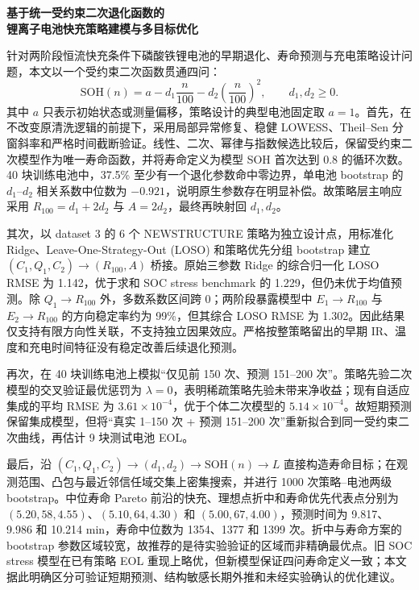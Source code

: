 \documentclass[UTF8,a4paper,zihao=-4]{ctexart}
\newcommand{\SOH}{\mathrm{SOH}}
\newcommand{\Rone}{R_{100}}
\begin{document}
\begin{center}
  {\bfseries{} 基于统一受约束二次退化函数的\\[0.35em]
  锂离子电池快充策略建模与多目标优化}
\end{center}

\vspace{0.7em}
针对两阶段恒流快充条件下磷酸铁锂电池的早期退化、寿命预测与充电策略设计问题，本文以一个受约束二次函数贯通四问：
\[
  \SOH(n)=a-d_1\frac{n}{100}-d_2\left(\frac{n}{100}\right)^2,
  \qquad d_1,d_2\geq 0.
\]
其中 $a$ 只表示初始状态或测量偏移，策略设计的典型电池固定取 $a=1$。首先，在不改变原清洗逻辑的前提下，采用局部异常修复、稳健 LOWESS、Theil--Sen 分窗斜率和严格时间截断验证。线性、二次、幂律与指数候选比较后，保留受约束二次模型作为唯一寿命函数，并将寿命定义为模型 SOH 首次达到 0.8 的循环次数。40 块训练电池中，37.5\% 至少有一个退化参数命中零边界，单电池 bootstrap 的 $d_1$--$d_2$ 相关系数中位数为 $-0.921$，说明原生参数存在明显补偿。故策略层主响应采用 $\Rone=d_1+2d_2$ 与 $A=2d_2$，最终再映射回 $d_1,d_2$。

其次，以 dataset 3 的 6 个 NEWSTRUCTURE 策略为独立设计点，用标准化 Ridge、Leave-One-Strategy-Out (LOSO) 和策略优先分组 bootstrap 建立 $(C_1,Q_1,C_2)\to(\Rone,A)$ 桥接。原始三参数 Ridge 的综合归一化 LOSO RMSE 为 1.142，优于求和 SOC stress benchmark 的 1.229，但仍未优于均值预测。除 $Q_1\to\Rone$ 外，多数系数区间跨 0；两阶段暴露模型中 $E_1\to\Rone$ 与 $E_2\to\Rone$ 的方向稳定率约为 99\%，但其综合 LOSO RMSE 为 1.302。因此结果仅支持有限方向性关联，不支持独立因果效应。严格按整策略留出的早期 IR、温度和充电时间特征没有稳定改善后续退化预测。

再次，在 40 块训练电池上模拟“仅见前 150 次、预测 151--200 次”。策略先验二次模型的交叉验证最优惩罚为 $\lambda=0$，表明稀疏策略先验未带来净收益；现有自适应集成的平均 RMSE 为 $3.61\times10^{-4}$，优于个体二次模型的 $5.14\times10^{-4}$。故短期预测保留集成模型，但将“真实 1--150 次 + 预测 151--200 次”重新拟合到同一受约束二次曲线，再估计 9 块测试电池 EOL。

最后，沿 $(C_1,Q_1,C_2)\to(d_1,d_2)\to\SOH(n)\to L$ 直接构造寿命目标；在观测范围、凸包与最近邻信任域交集上密集搜索，并进行 1000 次策略--电池两级 bootstrap。中位寿命 Pareto 前沿的快充、理想点折中和寿命优先代表点分别为 $(5.20,58,4.55)$、$(5.10,64,4.30)$ 和 $(5.00,67,4.00)$，预测时间为 9.817、9.986 和 10.214 min，寿命中位数为 1354、1377 和 1399 次。折中与寿命方案的 bootstrap 参数区域较宽，故推荐的是待实验验证的区域而非精确最优点。旧 SOC stress 模型在已有策略 EOL 重现上略优，但新模型保证四问寿命定义一致；本文据此明确区分可验证短期预测、结构敏感长期外推和未经实验确认的优化建议。
\end{document}
